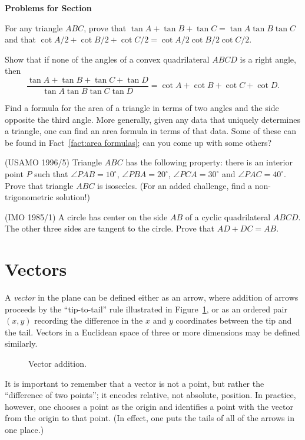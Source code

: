 \documentclass[12pt]{book}
\newcounter{exc}
\numberwithin{exc}{section}
\numberwithin{figure}{section}
\newenvironment{exer}{\vspace{0.1in}
\noindent \textbf{Problems for Section~\thesection} \vspace{0.1in}
\begin{list}{\arabic{exc}.}{\usecounter{exc}}}{\end{list}}
\numberwithin{equation}{theorem}
\def\ii{\item}
\begin{document}
\begin{exer}
\ii
For any triangle $ABC$, prove that $\tan A + \tan B + \tan C = \tan 
A \tan B \tan C$ and that $\cot A/2 + \cot B/2 + \cot C/2 = \cot A/2 
\cot B/2 \cot C/2$.
\ii
Show that if none of the angles of a convex quadrilateral $ABCD$
 is a right angle, then
\[
\frac{\tan A + \tan B + \tan C + \tan D}{\tan A \tan B \tan C \tan D}
 = \cot A + \cot B + \cot C + \cot D.
\]
\ii
Find a formula for the area of a triangle 
in terms of two angles and 
the side opposite the third angle. More generally, given any data 
that uniquely determines a triangle, one can find an area formula in 
terms of that data. Some of these can be found in
Fact~\ref{fact:area formulas}; can you come up with some others?
\ii
(USAMO 1996/5)
Triangle $ABC$ has the following property: there is an interior point 
$P$ such that $\angle PAB = 10^{\circ}$, $\angle PBA = 20^{\circ}$, 
$\angle PCA = 30^{\circ}$ and $\angle PAC = 40^{\circ}$. Prove that 
triangle $ABC$ is isosceles. (For an added challenge, find a 
non-trigonometric solution!)
\item (IMO 1985/1)
A circle has center on the side $AB$ of a cyclic quadrilateral $ABCD$.
The other three sides are tangent to the circle. Prove that $AD+DC=AB$.
\end{exer}

\section{Vectors}
 \label{sec:vec}

A \emph{vector} 
in the plane can be defined either as an arrow, where
addition of arrows proceeds by the ``tip-to-tail'' rule illustrated
in Figure~\ref{fig:vectoradd}, 
or as an ordered pair $(x, y)$ recording the difference in the
$x$ and $y$ coordinates between the tip and the tail. Vectors in a Euclidean space of three or more dimensions may be defined similarly.
\begin{figure}[ht]
\caption{Vector addition.}
\label{fig:vectoradd}
\end{figure}

It is important to remember that a vector is not a point, but 
rather the ``difference of two points''; it encodes relative, not 
absolute, position. In practice, however, one chooses a point as the 
origin and identifies a point with the vector from the origin 
to that point. (In effect, one puts the tails of all of the arrows in 
one place.)
\end{document}
